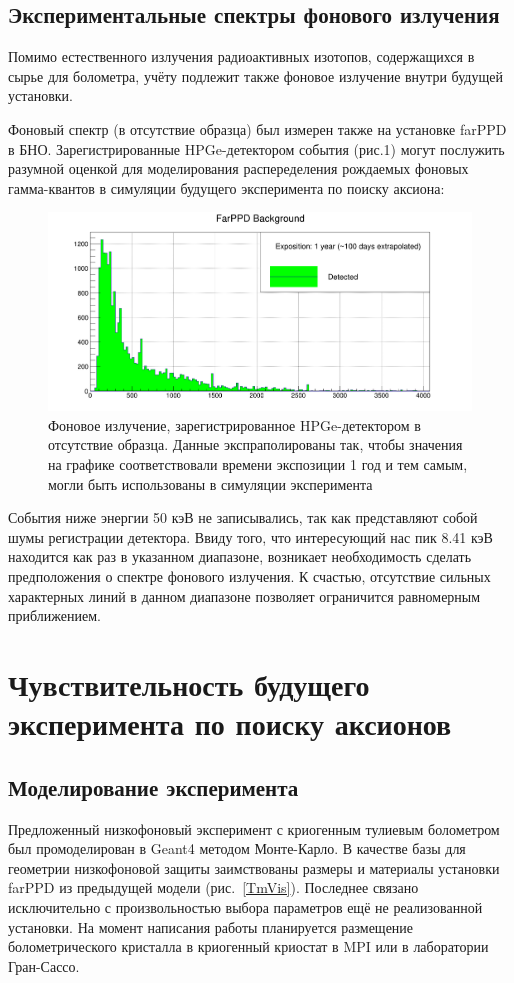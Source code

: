 \documentclass[a4paper,article,14pt]{extarticle}
\begin{document}
\subsection{Экспериментальные спектры фонового излучения}
Помимо естественного излучения радиоактивных изотопов, содержащихся в сырье для болометра, учёту подлежит также фоновое излучение внутри будущей установки.

Фоновый спектр (в отсутствие образца) был измерен также на установке farPPD в БНО. Зарегистрированные HPGe-детектором события (рис.1) могут послужить разумной оценкой для моделирования распеределения рождаемых фоновых гамма-квантов в симуляции будущего эксперимента по поиску аксиона:

\begin{figure}[h]
    \centering
    \includegraphics[width = \textwidth]{images/FarPPD_background.png}
    \caption{Фоновое излучение, зарегистрированное HPGe-детектором в отсутствие образца. Данные экспраполированы так, чтобы значения на графике соответствовали времени экспозиции 1 год и тем самым, могли быть использованы в симуляции эксперимента}
    \label{fon}
\end{figure}

События ниже энергии 50 кэВ не записывались, так как представляют собой шумы регистрации детектора. Ввиду того, что интересующий нас пик 8.41 кэВ находится как раз в указанном диапазоне, возникает необходимость сделать предположения о спектре фонового излучения. К счастью, отсутствие сильных характерных линий в данном диапазоне позволяет ограничится равномерным приближением.

\newpage
\section{Чувствительность будущего эксперимента по поиску аксионов}

\subsection{Моделирование эксперимента}
Предложенный низкофоновый эксперимент с криогенным тулиевым болометром был промоделирован в Geant4 методом Монте-Карло.
В качестве базы для геометрии низкофоновой защиты заимствованы размеры и материалы установки farPPD из предыдущей модели (рис.~\ref{TmVis}).
Последнее связано исключительно с произвольностью выбора параметров ещё не реализованной установки.
На момент написания работы планируется размещение болометрического кристалла в криогенный криостат в MPI или в лаборатории Гран-Сассо.
\end{document}
